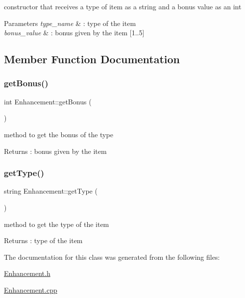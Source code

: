 constructor that receives a type of item as a string and a bonus value as an int 
\begin{DoxyParams}{Parameters}
{\em type\+\_\+name} & \+: type of the item \\
\hline
{\em bonus\+\_\+value} & \+: bonus given by the item \mbox{[}1..5\mbox{]} \\
\hline
\end{DoxyParams}


\subsection{Member Function Documentation}
\hypertarget{class_enhancement_afd0ea7d414468cf507a4673fd066fd89}{}\label{class_enhancement_afd0ea7d414468cf507a4673fd066fd89} 
\subsubsection{\texorpdfstring{get\+Bonus()}{getBonus()}}
{\footnotesize\ttfamily int Enhancement\+::get\+Bonus (\begin{DoxyParamCaption}{ }\end{DoxyParamCaption})}

method to get the bonus of the type \begin{DoxyReturn}{Returns}
\+: bonus given by the item 
\end{DoxyReturn}
\hypertarget{class_enhancement_abcdde9da0542f751301f4ddf1809a1cc}{}\label{class_enhancement_abcdde9da0542f751301f4ddf1809a1cc} 
\subsubsection{\texorpdfstring{get\+Type()}{getType()}}
{\footnotesize\ttfamily string Enhancement\+::get\+Type (\begin{DoxyParamCaption}{ }\end{DoxyParamCaption})}

method to get the type of the item \begin{DoxyReturn}{Returns}
\+: type of the item 
\end{DoxyReturn}


The documentation for this class was generated from the following files\+:\begin{DoxyCompactItemize}
\item 
\hyperlink{_enhancement_8h}{Enhancement.\+h}\item 
\hyperlink{_enhancement_8cpp}{Enhancement.\+cpp}\end{DoxyCompactItemize}
